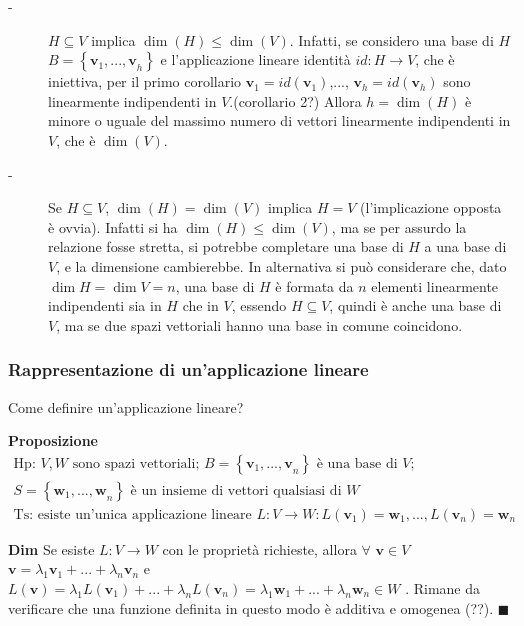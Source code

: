 \documentclass{article}
\begin{document}
\begin{description}
\item[-] $H\subseteq V$ implica $\dim \left( H\right) \leq \dim \left(
V\right) $. Infatti, se considero una base di $H$ $B=\left\{ \mathbf{v}_{1}%
\mathbf{,...,v}_{h}\right\} $ e l'applicazione lineare identit\`{a} $%
id:H\rightarrow V$, che \`{e} iniettiva, per il primo corollario $\mathbf{v}%
_{1}=id\left( \mathbf{v}_{1}\right) $,..., $\mathbf{v}_{h}=id\left( \mathbf{v%
}_{h}\right) $ sono linearmente indipendenti in $V$.(corollario 2?) Allora $%
h=\dim \left( H\right) $ \`{e} minore o uguale del massimo numero di vettori
linearmente indipendenti in $V$, che \`{e} $\dim \left( V\right) $.

\item[-] Se $H\subseteq V$, $\dim \left( H\right) =\dim \left( V\right) $
implica $H=V$ (l'implicazione opposta \`{e} ovvia). Infatti si ha $\dim
\left( H\right) \leq \dim \left( V\right) $, ma se per assurdo la relazione
fosse stretta, si potrebbe completare una base di $H$ a una base di $V$, e
la dimensione cambierebbe. In alternativa si pu\`{o} considerare che, dato $%
\dim H=\dim V=n$, una base di $H$ \`{e} formata da $n$ elementi linearmente
indipendenti sia in $H$ che in $V$, essendo $H\subseteq V$, quindi \`{e}
anche una base di $V$, ma se due spazi vettoriali hanno una base in comune
coincidono.
\end{description}

\subsubsection{Rappresentazione di un'applicazione lineare}

Come definire un'applicazione lineare?

\textbf{Proposizione} 
\begin{gather*}
\text{Hp}\text{: }V,W\text{ sono spazi vettoriali; }B=\left\{ \mathbf{v}_{1}%
\mathbf{,...,v}_{n}\right\} \text{ \`{e} una base di }V\text{; } \\
S=\left\{ \mathbf{w}_{1}\mathbf{,...,w}_{n}\right\} \text{ \`{e} un insieme
di vettori qualsiasi di }W \\
\text{Ts}\text{: esiste un'unica applicazione lineare }L:V\rightarrow
W:L\left( \mathbf{v}_{1}\right) =\mathbf{w}_{1},...,L\left( \mathbf{v}%
_{n}\right) =\mathbf{w}_{n}
\end{gather*}

\textbf{Dim} Se esiste $L:V\rightarrow W$ con le propriet\`{a} richieste,
allora $\forall $ $\mathbf{v}\in V$ $\mathbf{v}=\lambda _{1}\mathbf{v}%
_{1}+...+\lambda _{n}\mathbf{v}_{n}$ e $L\left( \mathbf{v}\right) =\lambda
_{1}L\left( \mathbf{v}_{1}\right) +...+\lambda _{n}L\left( \mathbf{v}%
_{n}\right) =\lambda _{1}\mathbf{w}_{1}+...+\lambda _{n}\mathbf{w}_{n}\in W$%
. Rimane da verificare che una funzione definita in questo modo \`{e}
additiva e omogenea (??). $\blacksquare $
\end{document}
